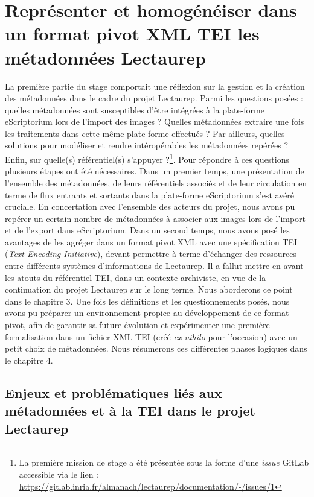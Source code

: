 \part{Représenter et homogénéiser dans un format pivot XML TEI les métadonnées Lectaurep}

La première partie du stage comportait une réflexion sur la gestion et la création des métadonnées dans le cadre du projet Lectaurep. Parmi les questions posées : quelles métadonnées sont susceptibles d'être intégrées à la plate-forme eScriptorium lors de l'import des images ? Quelles métadonnées extraire une fois les traitements dans cette même plate-forme effectués ? Par ailleurs, quelles solutions pour modéliser et rendre intéropérables les  métadonnées repérées ? Enfin, sur quelle(s) référentiel(s) s'appuyer ?\footnote{La première mission de stage a été présentée sous la forme d'une \textit{issue} GitLab accessible via le lien : \url{https://gitlab.inria.fr/almanach/lectaurep/documentation/-/issues/1}}. Pour répondre à ces questions plusieurs étapes ont été nécessaires. Dans un premier temps, une présentation de l'ensemble des métadonnées, de leurs référentiels associés et de leur circulation en terme de flux entrants et sortants dans la plate-forme eScriptorium s'est avéré cruciale. En concertation avec l'ensemble des acteurs du projet, nous avons pu repérer un certain nombre de métadonnées à associer aux images lors de l'import et de l'export dans eScriptorium. Dans un second temps, nous avons posé les avantages de les agréger dans un format pivot XML avec une spécification TEI (\textit{Text Encoding Initiative}), devant permettre à terme d'échanger des ressources entre différents systèmes d'informations de Lectaurep. Il a fallut mettre en avant les atouts du référentiel TEI, dans un contexte archiviste, en vue de la continuation du projet Lectaurep sur le long terme. Nous aborderons ce point dans le chapitre 3. Une fois les définitions et les questionnements posés, nous avons pu préparer un environnement propice au développement  de ce format pivot, afin de garantir sa future évolution et expérimenter une première formalisation dans un fichier XML TEI (créé \textit{ex nihilo} pour l'occasion) avec un petit choix de métadonnées. Nous résumerons ces différentes phases logiques dans le chapitre 4.


\chapter{Enjeux et problématiques liés aux métadonnées et à la TEI dans le projet Lectaurep}

